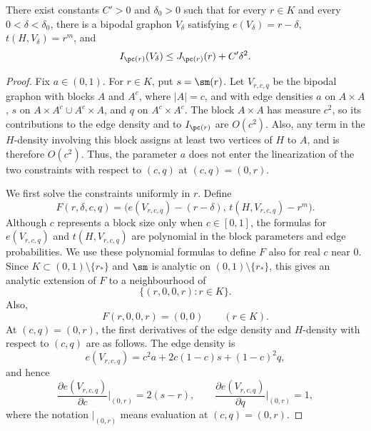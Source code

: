 \begin{lemma}\label{lem:bipodal-quadratic-bound}
There exist constants $C'>0$ and $\delta_0>0$ such that
for every $r\in K$ and every $0<\delta<\delta_0$, there is a bipodal graphon
$V_\delta$ satisfying $e(V_\delta)=r-\delta$, $t(H,V_\delta)=r^m$,
and
\begin{equation}\label{eq:bipodal-quadratic-bound}
  I_{\pc(r)}(V_\delta)
  \le
  J_{\pc(r)}(r)+C'\delta^2.
\end{equation}
\end{lemma}

\begin{proof}
Fix $a\in(0,1)$.
For $r\in K$, put $s=\sm(r)$.  Let $V_{r,c,q}$ be the bipodal graphon with
blocks $A$ and $A^c$, where $|A|=c$, and with edge densities $a$ on
$A\times A$, $s$ on $A\times A^c\cup A^c\times A$, and $q$ on
$A^c\times A^c$.  The block $A\times A$ has measure $c^2$, so its contributions
to the edge density and to $I_{\pc(r)}$ are $O(c^2)$.  Also, any term in the
$H$-density involving this block assigns at least two vertices of $H$ to $A$,
and is therefore $O(c^2)$.  Thus, the parameter $a$ does not enter the
linearization of the two constraints with respect to $(c,q)$ at $(c,q)=(0,r)$.

We first solve the constraints uniformly in $r$.  Define
\[
  F(r,\delta,c,q)
  =
  \bigl(e(V_{r,c,q})-(r-\delta),\,
        t(H,V_{r,c,q})-r^m\bigr).
\]
Although $c$ represents a block size only when $c\in[0,1]$, the formulas for
$e(V_{r,c,q})$ and $t(H,V_{r,c,q})$ are polynomial in the block parameters
and edge probabilities.  We use these polynomial formulas to define $F$ also
for real $c$ near $0$.  Since $K\subset(0,1)\setminus\{r_*\}$ and $\sm$ is
analytic on $(0,1)\setminus\{r_*\}$, this gives an analytic extension of $F$
to a neighbourhood of
\[
  \{(r,0,0,r):r\in K\}.
\]
Also,
\[
  F(r,0,0,r)=(0,0)
  \qquad (r\in K).
\]
At $(c,q)=(0,r)$, the first derivatives of the edge density and
$H$-density with respect to $(c,q)$ are as follows.  The edge density is
\[
  e(V_{r,c,q})=c^2a+2c(1-c)s+(1-c)^2q,
\]
and hence
\[
  \frac{\partial e(V_{r,c,q})}{\partial c}\bigg|_{(0,r)}=2(s-r),
  \qquad
  \frac{\partial e(V_{r,c,q})}{\partial q}\bigg|_{(0,r)}=1,
\]
where the notation $|_{(0,r)}$ means evaluation at $(c,q)=(0,r)$.


\end{proof}
